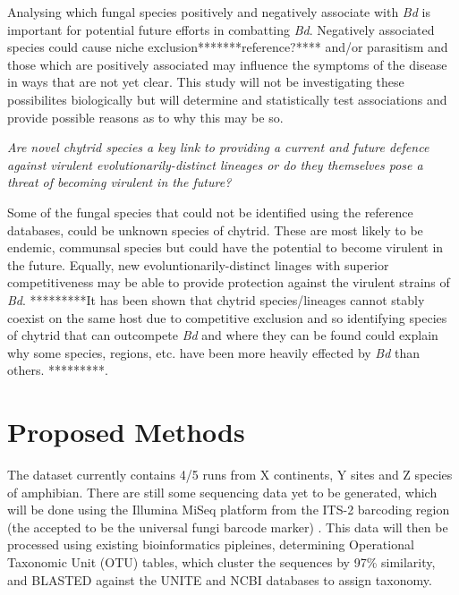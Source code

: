 \documentclass[11pt, a4paper, titlepage]{article}
\begin{document}
\noindent Analysing which fungal species positively and negatively associate with \textit{Bd} is important for potential future efforts in combatting \textit{Bd}. Negatively associated species could cause niche exclusion*******reference?**** and/or parasitism and those which are positively associated may influence the symptoms of the disease in ways that are not yet clear. This study will not be investigating these possibilites biologically but will determine and statistically test associations and provide possible reasons as to why this may be so. \newline

\noindent \textit{Are novel chytrid species a key link to providing a current and future defence against virulent evolutionarily-distinct lineages or do they themselves pose a threat of becoming virulent in the future?} \newline

\noindent Some of the fungal species that could not be identified using the reference databases, could be unknown species of chytrid. These are most likely to be endemic, communsal species but could have the potential to become virulent in the future. Equally, new evoluntionarily-distinct linages with superior competitiveness may be able to provide protection against the virulent strains of \textit{Bd}. 
*********It has been shown that chytrid species/lineages cannot stably coexist on the same host due to competitive exclusion and so identifying species of chytrid that can outcompete \textit{Bd} and where they can be found could explain why some species, regions, etc. have been more heavily effected by \textit{Bd} than others. \parencite{}*********.

\section{Proposed Methods}

The dataset currently contains 4/5 runs from X continents, Y sites and Z species of amphibian. There are still some sequencing data yet to be generated, which will be done using the Illumina MiSeq platform from the ITS-2 barcoding region  (the accepted to be the universal fungi barcode marker) \parencite{Schoch2012}. This data will then be processed using existing bioinformatics pipleines, determining Operational Taxonomic Unit (OTU) tables, which cluster the sequences by 97\% similarity, and BLASTED against the UNITE and NCBI databases to assign taxonomy. \newline
\end{document}
